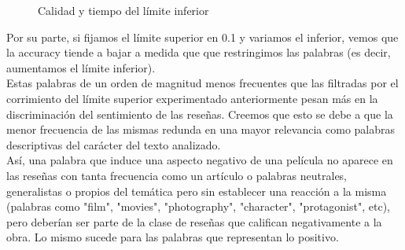 \begin{figure}[H]
\caption{Calidad y tiempo del límite inferior}
\label{fig:exp2-metricas-ll}
\end{figure}

Por su parte, si fijamos el límite superior en 0.1 y variamos el inferior, vemos que la accuracy tiende a bajar a medida que que restringimos las palabras (es decir, aumentamos el límite inferior).\\
Estas palabras de un orden de magnitud menos frecuentes que las filtradas por el corrimiento del límite superior experimentado anteriormente pesan más en la discriminación del sentimiento de las reseñas. 
Creemos que esto se debe a que la menor frecuencia de las mismas redunda en una mayor relevancia como palabras descriptivas del carácter del texto analizado. \\

Así, una palabra que induce una aspecto negativo de una película no aparece en las reseñas con tanta frecuencia como un artículo o palabras neutrales, generalistas o propios del temática pero sin establecer una reacción a la misma (palabras como "film", "movies", "photography", "character", "protagonist", etc), pero deberían ser parte de la clase de reseñas que califican negativamente a la obra. Lo mismo sucede para las palabras que representan lo positivo. \\

